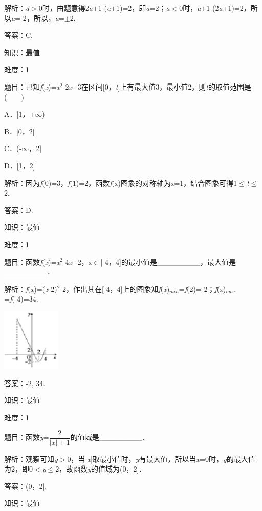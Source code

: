 \documentclass{article} %
\begin{document}
解析：\textit{a}$\mathrm{>}$0时，由题意得2\textit{a}+1-(\textit{a}+1)=2，即\textit{a}=2；\textit{a}$\mathrm{<}$0时，\textit{a}+1-(2\textit{a}+1)=2，所以\textit{a}=-2，所以，\textit{a}=$\mathrm{\pm}$2.

答案：C.

知识：最值

难度：1

题目：已知\textit{f}(\textit{x})=\textit{x}${}^{2}$-2\textit{x}+3在区间[0，\textit{t}]上有最大值3，最小值2，则\textit{t}的取值范围是(　　)

A．[1，+$\mathrm{\infty}$)   

B．[0，2]

C．(-$\mathrm{\infty}$，2]  

D．[1，2]

解析：因为\textit{f}(0)=3，\textit{f}(1)=2，函数\textit{f}(\textit{x})图象的对称轴为\textit{x}=1，结合图象可得1$\mathrm{\le}$\textit{t}$\mathrm{\le}$2.

答案：D.

知识：最值

难度：1

题目：函数\textit{f}(\textit{x})=\textit{x}${}^{2}$-4\textit{x}+2，\textit{x}$\mathrm{\in}$[-4，4]的最小值是\_\_\_\_\_\_\_\_，最大值是\_\_\_\_\_\_\_\_．

解析：\textit{f}(\textit{x})=(\textit{x}-2)${}^{2}$-2，作出其在[-4，4]上的图象知\textit{f}(\textit{x})${}_{min}$=\textit{f}(2)=-2；\textit{f}(\textit{x})${}_{max}$=\textit{f}(-4)=34.

\includegraphics*[width=1.10in, height=1.17in, keepaspectratio=false]{image37}

答案：-2, 34.

知识：最值

难度：1

题目：函数\textit{y}=$\dfrac{2}{|x|+1}$的值域是\_\_\_\_\_\_\_\_．

解析：观察可知\textit{y}$\mathrm{>}$0，当|\textit{x}|取最小值时，\textit{y}有最大值，所以当\textit{x}=0时，\textit{y}的最大值为2，即0$\mathrm{<}$\textit{y}$\mathrm{\le}$2，故函数\textit{y}的值域为(0，2]．

答案：(0，2].

知识：最值
\end{document}

